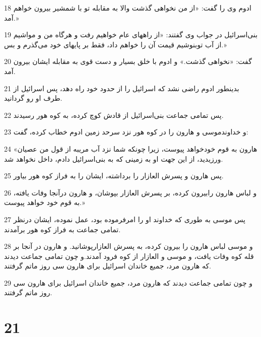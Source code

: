 \par 18 ادوم وی را گفت: «از من نخواهی گذشت والا به مقابله تو با شمشیر بیرون خواهم آمد.»
\par 19 بنی‌اسرائیل در جواب وی گفتند: «از راههای عام خواهیم رفت و هرگاه من و مواشیم از آب توبنوشیم قیمت آن را خواهم داد، فقط بر پایهای خود می‌گذرم و بس.»
\par 20 گفت: «نخواهی گذشت.» و ادوم با خلق بسیار و دست قوی به مقابله ایشان بیرون آمد.
\par 21 بدینطور ادوم راضی نشد که اسرائیل را از حدود خود راه دهد، پس اسرائیل از طرف او رو گردانید.
\par 22 پس تمامی جماعت بنی‌اسرائیل از قادش کوچ کرده، به کوه هور رسیدند.
\par 23 و خداوندموسی و هارون را در کوه هور نزد سرحد زمین ادوم خطاب کرده، گفت:
\par 24 «هارون به قوم خودخواهد پیوست، زیرا چونکه شما نزد آب مریبه از قول من عصیان ورزیدید، از این جهت او به زمینی که به بنی‌اسرائیل دادم، داخل نخواهد شد.
\par 25 پس هارون و پسرش العازار را برداشته، ایشان را به فراز کوه هور بیاور.
\par 26 و لباس هارون رابیرون کرده، بر پسرش العازار بپوشان، و هارون درآنجا وفات یافته، به قوم خود خواهد پیوست.» 
\par 27 پس موسی به طوری که خداوند او را امرفرموده بود، عمل نموده، ایشان درنظر تمامی جماعت به فراز کوه هور برآمدند.
\par 28 و موسی لباس هارون را بیرون کرده، به پسرش العازارپوشانید. و هارون در آنجا بر قله کوه وفات یافت، و موسی و العازار از کوه فرود آمدند.و چون تمامی جماعت دیدند که هارون مرد، جمیع خاندان اسرائیل برای هارون سی روز ماتم گرفتند.
\par 29 و چون تمامی جماعت دیدند که هارون مرد، جمیع خاندان اسرائیل برای هارون سی روز ماتم گرفتند.
 
\chapter{21}

